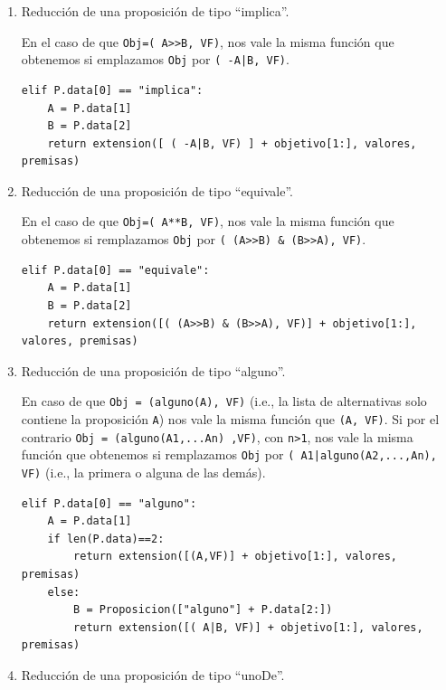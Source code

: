 \documentclass[10pt,a4paper]{report}
\begin{document}
\begin{enumerate}
\begin{verbatim}
\end{verbatim}
\item Reducción de una proposición de tipo ``implica''.
\label{sec:orgb2176da}

En el caso de que \texttt{Obj=( A>{}>{}B, VF)}, nos vale la misma función que obtenemos si emplazamos \texttt{Obj} por \texttt{( -A|B, VF)}.
\begin{verbatim}
elif P.data[0] == "implica":
    A = P.data[1]
    B = P.data[2]
    return extension([ ( -A|B, VF) ] + objetivo[1:], valores, premisas)
\end{verbatim}
\item Reducción de una proposición de tipo ``equivale''.
\label{sec:org049008a}

En el caso de que \texttt{Obj=( A**B, VF)}, nos vale la misma función que obtenemos si remplazamos \texttt{Obj} por \texttt{( (A>{}>{}B) \& (B>{}>{}A), VF)}.
\begin{verbatim}
elif P.data[0] == "equivale":
    A = P.data[1]
    B = P.data[2]
    return extension([( (A>>B) & (B>>A), VF)] + objetivo[1:], valores, premisas)
\end{verbatim}
\item Reducción de una proposición de tipo ``alguno''.
\label{sec:orgdfb37ee}

En caso de que \texttt{Obj = (alguno(A), VF)} (i.e., la lista de alternativas solo contiene la proposición \texttt{A}) nos vale la misma función que \texttt{(A, VF)}. 
Si por el contrario \texttt{Obj = (alguno(A1,...An) ,VF)}, con \texttt{n>1}, nos vale la misma función que obtenemos si remplazamos \texttt{Obj} por \texttt{( A1|alguno(A2,...,An), VF)} (i.e., la primera o alguna de las demás).
\begin{verbatim}
elif P.data[0] == "alguno":
    A = P.data[1]
    if len(P.data)==2:
        return extension([(A,VF)] + objetivo[1:], valores, premisas)
    else:
        B = Proposicion(["alguno"] + P.data[2:])
        return extension([( A|B, VF)] + objetivo[1:], valores, premisas)
\end{verbatim}
\item Reducción de una proposición de tipo ``unoDe''.
\label{sec:org6956f75}


\end{enumerate}
\end{document}
